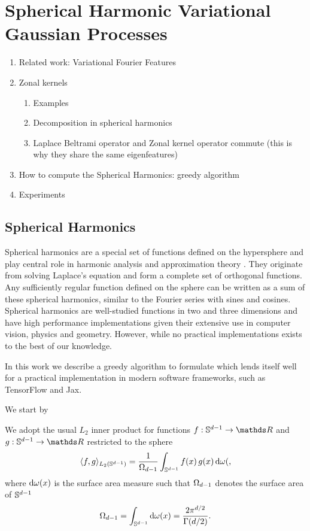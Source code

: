 \chapter{Spherical Harmonic Variational Gaussian Processes}

\begin{enumerate}
    \item Related work: Variational Fourier Features
    \item Zonal kernels
    \begin{enumerate}
        \item Examples
        \item Decomposition in spherical harmonics
        \item Laplace Beltrami operator and Zonal kernel operator commute (this is why they share the same eigenfeatures)
    \end{enumerate}
    \item How to compute the Spherical Harmonics: greedy algorithm
    \item Experiments
\end{enumerate}


\section{Spherical Harmonics}

Spherical harmonics are a special set of functions defined on the hypersphere and play central role in harmonic analysis and approximation theory \citep{wendland2005}. They originate from solving Laplace's equation and form a complete set of orthogonal functions. Any sufficiently regular function defined on the sphere can be written as a sum of these spherical harmonics, similar to the Fourier series with sines and cosines. Spherical harmonics are well-studied functions in two and three dimensions and have high performance implementations given their extensive use in computer vision, physics and geometry. However, while no practical implementations exists to the best of our knowledge.

In this work we describe a greedy algorithm to formulate 
which lends itself well for a practical implementation in modern software frameworks, such as TensorFlow and Jax.

We start by 
\citep{dai2013,frye2014}


We adopt the usual $L_2$ inner product for functions $f: \dsphere \rightarrow \Reals$ and $g: \dsphere \rightarrow \Reals$ restricted to the sphere 
\begin{equation}
     \langle f, g\rangle_{L_{2}(\mathbb{S}^{d-1})} = \frac{1}{\Omega_{d-1}} \int_{\mathbb{S}^{d-1}} f(x)\,g(x) \, \mathrm{d}{\omega(},
\end{equation}
where $\mathrm{d}{\omega(x)}$ is the surface area measure such that $\Omega_{d-1}$ denotes the surface area of $\mathbb{S}^{d-1}$ 
\begin{equation}
\label{eq:surface}
    \Omega_{d-1} = \int_{\mathbb{S}^{d-1}} \mathrm{d}{\omega(x)} = \frac{2 \pi ^ {d/2}}{\Gamma(d/2)}.
\end{equation}

